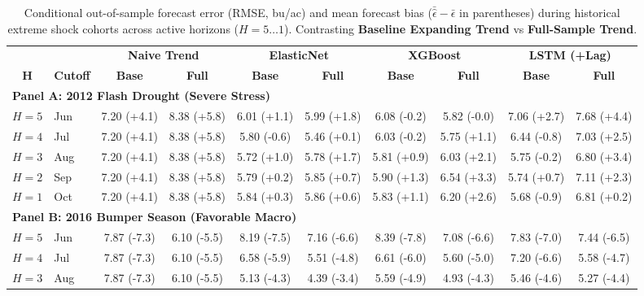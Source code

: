 \begin{table}[htbp]
\centering
\singlespacing
\scriptsize
\setlength{\tabcolsep}{2.5pt}
\renewcommand{\arraystretch}{1.10}
\caption{Conditional out-of-sample forecast error (RMSE, bu/ac) and mean forecast bias ($\bar{\hat{\epsilon}} - \bar{\epsilon}$ in parentheses) during historical extreme shock cohorts across active horizons ($H = 5 \dots 1$). Contrasting \textbf{Baseline Expanding Trend} vs \textbf{Full-Sample Trend}.}
\label{tab:comp_tail_risk_performance}
\begin{tabular*}{\textwidth}{@{\extracolsep{\fill}} c l cc cc cc cc @{}}
\toprule
& & \multicolumn{2}{c}{\textbf{Naive Trend}} & \multicolumn{2}{c}{\textbf{ElasticNet}} & \multicolumn{2}{c}{\textbf{XGBoost}} & \multicolumn{2}{c}{\textbf{LSTM (+Lag)}} \\
\cmidrule(lr){3-4}\cmidrule(lr){5-6}\cmidrule(lr){7-8}\cmidrule(lr){9-10}
\textbf{H} & \textbf{Cutoff} & \textbf{Base} & \textbf{Full} & \textbf{Base} & \textbf{Full} & \textbf{Base} & \textbf{Full} & \textbf{Base} & \textbf{Full} \\
\midrule
\multicolumn{10}{l}{\textbf{Panel A: 2012 Flash Drought (Severe Stress)}} \\
$H=5$ & Jun & 7.20 (+4.1) & 8.38 (+5.8) & 6.01 (+1.1) & 5.99 (+1.8) & 6.08 (-0.2) & 5.82 (-0.0) & 7.06 (+2.7) & 7.68 (+4.4) \\
$H=4$ & Jul & 7.20 (+4.1) & 8.38 (+5.8) & 5.80 (-0.6) & 5.46 (+0.1) & 6.03 (-0.2) & 5.75 (+1.1) & 6.44 (-0.8) & 7.03 (+2.5) \\
$H=3$ & Aug & 7.20 (+4.1) & 8.38 (+5.8) & 5.72 (+1.0) & 5.78 (+1.7) & 5.81 (+0.9) & 6.03 (+2.1) & 5.75 (-0.2) & 6.80 (+3.4) \\
$H=2$ & Sep & 7.20 (+4.1) & 8.38 (+5.8) & 5.79 (+0.2) & 5.85 (+0.7) & 5.90 (+1.3) & 6.54 (+3.3) & 5.74 (+0.7) & 7.11 (+2.3) \\
$H=1$ & Oct & 7.20 (+4.1) & 8.38 (+5.8) & 5.84 (+0.3) & 5.86 (+0.6) & 5.83 (+1.1) & 6.20 (+2.6) & 5.68 (-0.9) & 6.81 (+0.2) \\
\midrule
\multicolumn{10}{l}{\textbf{Panel B: 2016 Bumper Season (Favorable Macro)}} \\
$H=5$ & Jun & 7.87 (-7.3) & 6.10 (-5.5) & 8.19 (-7.5) & 7.16 (-6.6) & 8.39 (-7.8) & 7.08 (-6.6) & 7.83 (-7.0) & 7.44 (-6.5) \\
$H=4$ & Jul & 7.87 (-7.3) & 6.10 (-5.5) & 6.58 (-5.9) & 5.51 (-4.8) & 6.61 (-6.0) & 5.60 (-5.0) & 7.20 (-6.6) & 5.58 (-4.7) \\
$H=3$ & Aug & 7.87 (-7.3) & 6.10 (-5.5) & 5.13 (-4.3) & 4.39 (-3.4) & 5.59 (-4.9) & 4.93 (-4.3) & 5.46 (-4.6) & 5.27 (-4.4) \\

\end{tabular*}
\end{table}
